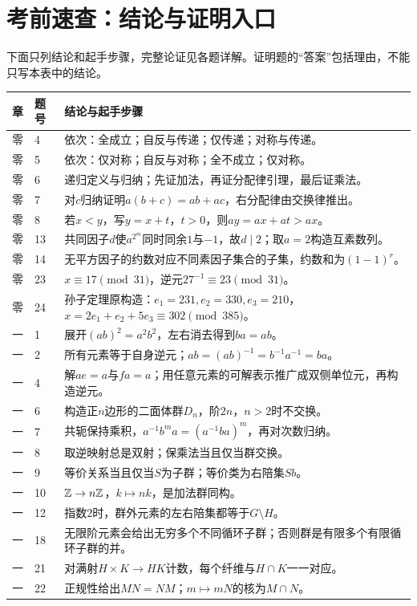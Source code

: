 \section{考前速查：结论与证明入口}
下面只列结论和起手步骤，完整论证见各题详解。证明题的“答案”包括理由，不能只写本表中的结论。
\small
\begin{longtable}{p{1.1cm}p{1.0cm}p{12.1cm}}
\toprule 章 & 题号 & 结论与起手步骤\\\midrule\endhead
零&4&依次：全成立；自反与传递；仅传递；对称与传递。\\
零&5&依次：仅对称；自反与对称；全不成立；仅对称。\\
零&6&递归定义与归纳；先证加法，再证分配律引理，最后证乘法。\\
零&7&对$c$归纳证明$a(b+c)=ab+ac$，右分配律由交换律推出。\\
零&8&若$x<y$，写$y=x+t$，$t>0$，则$ay=ax+at>ax$。\\
零&13&共同因子$d$使$a^{2^m}$同时同余$1$与$-1$，故$d\mid2$；取$a=2$构造互素数列。\\
零&14&无平方因子的约数对应不同素因子集合的子集，约数和为$(1-1)^r$。\\
零&23&$x\equiv17\pmod{31}$，逆元$27^{-1}\equiv23\pmod{31}$。\\
零&24&孙子定理原构造：$e_1=231,e_2=330,e_3=210$，$x=2e_1+e_2+5e_3\equiv302\pmod{385}$。\\\midrule
一&1&展开$(ab)^2=a^2b^2$，左右消去得到$ba=ab$。\\
一&2&所有元素等于自身逆元；$ab=(ab)^{-1}=b^{-1}a^{-1}=ba$。\\
一&4&解$ae=a$与$fa=a$；用任意元素的可解表示推广成双侧单位元，再构造逆元。\\
一&6&构造正$n$边形的二面体群$D_n$，阶$2n$，$n>2$时不交换。\\
一&7&共轭保持乘积，$a^{-1}b^ma=(a^{-1}ba)^m$，再对次数归纳。\\
一&8&取逆映射总是双射；保乘法当且仅当群交换。\\
一&9&等价关系当且仅当$S$为子群；等价类为右陪集$Sb$。\\
一&10&$\mathbb Z\to n\mathbb Z$，$k\mapsto nk$，是加法群同构。\\
一&12&指数$2$时，群外元素的左右陪集都等于$G\setminus H$。\\
一&18&无限阶元素会给出无穷多个不同循环子群；否则群是有限多个有限循环子群的并。\\
一&21&对满射$H\times K\to HK$计数，每个纤维与$H\cap K$一一对应。\\
一&22&正规性给出$MN=NM$；$m\mapsto mN$的核为$M\cap N$。\\

\end{longtable}
